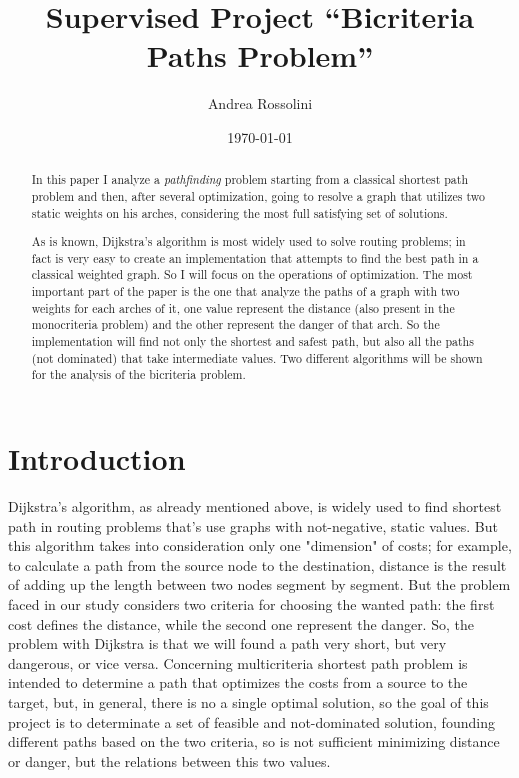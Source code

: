 \documentclass[a4paper,11pt]{report}
\title{Supervised Project ``Bicriteria Paths Problem''}
\author{Andrea Rossolini}
\date{\today}
\begin{document}
 
\maketitle

\begin{abstract}
In this paper I analyze a \textit{pathfinding} problem starting from a classical shortest path problem and then, after several optimization, going to resolve a graph that utilizes two static weights on his arches, considering the most full satisfying set of solutions.

As is known, Dijkstra's algorithm is most widely used to solve routing problems; in fact is very easy to create an implementation that attempts to find the best path in a classical weighted graph. So I will focus on the operations of optimization.
%
The most important part of the paper is the one that analyze the paths of a graph with two weights for each arches of it, one value represent the distance (also present in the monocriteria problem) and the other represent the danger of that arch. So the implementation will find not only the shortest and safest path, but also all the paths (not dominated) that take intermediate values. Two different algorithms will be shown for the analysis of the bicriteria problem.
\end{abstract}

\tableofcontents

\chapter{Introduction}
Dijkstra's algorithm, as already mentioned above, is widely used to find shortest path in routing problems that's use graphs with not-negative, static values. But this algorithm takes into consideration only one "dimension" of costs; for example, to calculate a path from the source node to the destination, distance is the result of adding up the length between two nodes segment by segment.
%
But the problem faced in our study considers two criteria for choosing the wanted path: the first cost defines the distance, while the second one represent the danger. So, the problem with Dijkstra is that we will found a path very short, but very dangerous, or vice versa. Concerning multicriteria shortest path problem is intended to determine a path that optimizes the costs from a source to the target, but, in general, there is no a single optimal solution, so the goal of this project is to determinate a set of feasible and not-dominated solution, founding different paths 
based on the two criteria, so is not sufficient minimizing distance or danger, but the relations between this two values.
\vspace{5mm}
\end{document}
